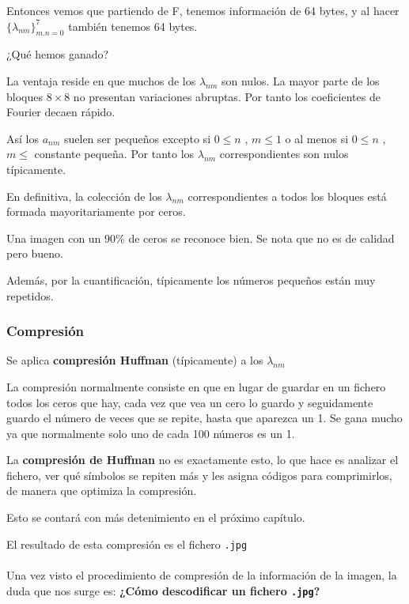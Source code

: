 			Entonces vemos que partiendo de F, tenemos información de 64 bytes, y al hacer $\{\lambda_{nm}\}^7_{m.n=0}$ también tenemos 64 bytes.

			¿Qué hemos ganado?

			La ventaja reside en que muchos de los $\lambda_{nm}$ son nulos.
			La mayor parte de los bloques $8\times 8$ no presentan variaciones abruptas. Por tanto los coeficientes de Fourier decaen rápido.

			Así los $a_{nm}$ suelen ser pequeños excepto si $0 \leq n$ , $m \leq 1$ o al menos si $0 \leq n$ , $m \leq$ constante pequeña. Por tanto los $\lambda_{nm}$ correspondientes son nulos típicamente.

			En definitiva, la colección de los $\lambda_{nm}$ correspondientes a todos los bloques está formada mayoritariamente por ceros.

			\begin{example}
				Una imagen con un  $90\%$ de ceros se reconoce bien. Se nota que no es de calidad pero bueno.
			\end{example}

			Además, por la cuantificación, típicamente los números pequeños están muy repetidos.

		\subsubsection{Compresión}
			Se aplica \textbf{compresión Huffman} (típicamente) a los $\lambda_{nm}$

			La compresión normalmente consiste en que en lugar de guardar en un fichero todos los ceros que hay, cada vez que vea un cero lo guardo y seguidamente guardo el número de veces que se repite, hasta que aparezca un 1. Se gana mucho ya que normalmente solo uno de cada 100 números es un 1.

			\obs La \textbf{compresión de Huffman} no es exactamente esto, lo que hace es analizar el fichero, ver qué símbolos se repiten más y les asigna códigos para comprimirlos, de manera que optimiza la compresión.

			Esto se contará con más detenimiento en el próximo capítulo.


			El resultado de esta compresión es el fichero \texttt{.jpg}\\\\


			Una vez visto el procedimiento de compresión de la información de la imagen, la duda que nos surge es: \textbf{¿Cómo descodificar un  fichero \texttt{.jpg}?}


